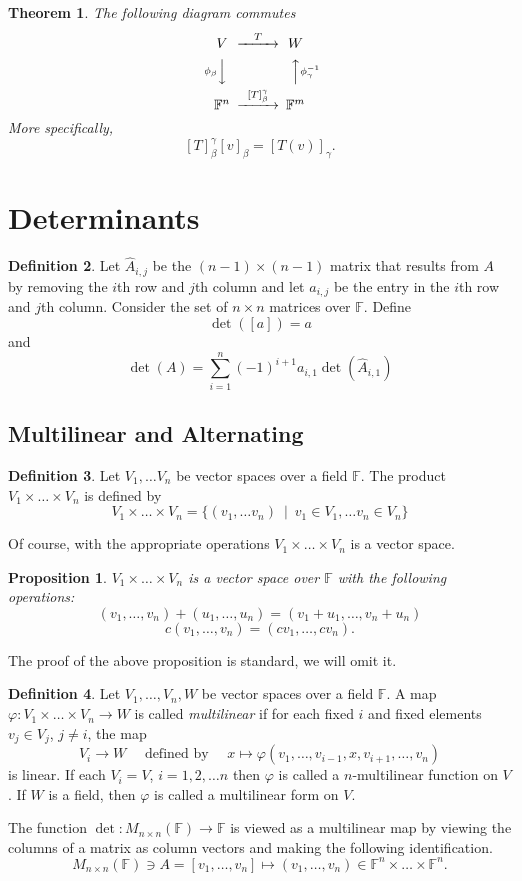 \documentclass[12pt,letterpaper]{article}
\theoremstyle{plain}
\newtheorem{theorem}{Theorem}[section]
\newtheorem{proposition}{Proposition}[section]
\theoremstyle{definition}
\newtheorem{definition}[theorem]{Definition}
\numberwithin{equation}{section}
\begin{document}
\begin{theorem} The following diagram commutes\\
\[
\begin{CD}
V @>T>> W\\
@V\phi_{\beta}VV @AA\phi_\gamma^{-1} A\\
\mathbb{F}^n @>[T]_{\beta}^\gamma>> \mathbb{F}^m
\end{CD}
\]
More specifically, 
\[[T]_{\beta}^\gamma[v]_{\beta}=[T(v)]_{\gamma}.\]
\end{theorem}
\section{Determinants}
\begin{definition} Let $\hat{A}_{i,j}$ be the $(n-1)\times (n-1)$ matrix that results from $A$ by removing the $i$th row and $j$th column and let $a_{i,j}$ be the entry in the $i$th row and $j$th column.  Consider the set of $n\times n$ matrices over $\mathbb{F}$.  
Define \[\det([a])=a\]
and
\[\det(A)=\sum_{i=1}^n(-1)^{i+1}a_{i,1}\det(\hat{A}_{i,1})\]
\end{definition}
\subsection{Multilinear and Alternating}\label{Multilinear and Alternating}

\begin{definition} Let $V_1, \ldots V_n$ be vector spaces over a field $\mathbb{F}$. The product $V_1\times \ldots \times V_n$ is defined by 
\[V_1\times \ldots \times V_n=\{(v_1,\ldots v_n)\ \mid \ v_1\in V_1, \ldots v_n\in V_n\}\] 
\end{definition}
Of course, with the appropriate operations $V_1\times \ldots \times V_n$ is a vector space. 
\begin{proposition} $V_1\times \ldots \times V_n$ is a vector space over $\mathbb{F}$ with the following operations:
\[(v_1,\ldots, v_n)+(u_1, \ldots, u_n)=(v_1+u_1, \ldots, v_n+u_n)\]
\[c(v_1, \ldots, v_n)=(cv_1, \ldots, cv_n).\]
\end{proposition}
The proof of the above proposition is standard, we will omit it. 
\begin{definition} Let $V_1, \ldots ,V_n, W$ be vector spaces over a field $\mathbb{F}$. 
A map $\varphi:V_1\times\ldots \times V_n\rightarrow W$ is called \emph{multilinear} if for each fixed $i$ and fixed elements $v_j\in V_j$, $j\neq i$, the map
\[V_i\rightarrow W\quad \text{ defined by }\quad x\mapsto \varphi(v_1, \ldots, v_{i-1}, x, v_{i+1}, \ldots ,v_n)\]
is linear. If each $V_i=V$, $i=1,2,\ldots n$ then $\varphi$ is called a $n$-multilinear function on $V$. If $W$ is a field, then $\varphi$ is called a multilinear form on $V$. 

The function $\det:M_{n\times n}(\mathbb{F})\rightarrow \mathbb{F}$ is viewed as a multilinear map by viewing the columns of a matrix as column vectors and making the following identification. 
\[M_{n\times n}(\mathbb{F})\ni A=[v_1,\ldots, v_n]\mapsto (v_1, \ldots, v_n)\in \mathbb{F}^n\times \ldots \times \mathbb{F}^n.\]
\end{definition}
\end{document}

